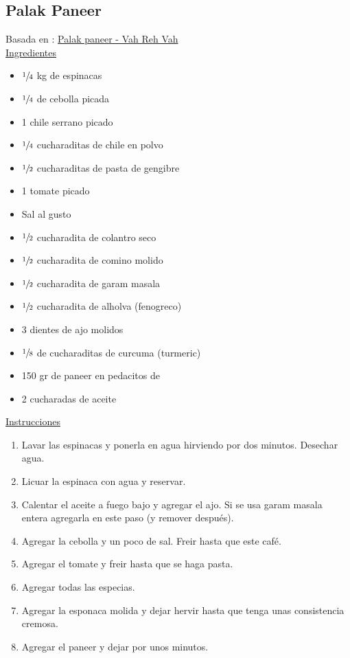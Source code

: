 \subsection{Palak Paneer}

Basada en : \href{https://www.vahrehvah.com/palak-paneer}{Palak paneer - Vah Reh Vah} \\

\underline{Ingredientes}
\begin{itemize}
\item $\sfrac{1}{4}$ kg de espinacas
\item $\sfrac{1}{4}$  de cebolla picada
\item 1 chile serrano picado
\item $\sfrac{1}{4}$ cucharaditas de chile en polvo
\item $\sfrac{1}{2}$ cucharaditas de pasta de gengibre
\item 1 tomate picado
\item Sal al gusto
\item $\sfrac{1}{2}$ cucharadita de colantro seco
\item $\sfrac{1}{2}$ cucharadita de comino molido
\item $\sfrac{1}{2}$ cucharadita de garam masala
\item $\sfrac{1}{2}$ cucharadita de alholva (fenogreco)
\item 3 dientes de ajo molidos
\item $\sfrac{1}{8}$ de cucharaditas de curcuma (turmeric)
\item 150 gr de paneer en pedacitos de \Sim 1cm
\item 2 cucharadas de aceite
\end{itemize}


\underline{Instrucciones}
\begin{enumerate}
\item Lavar las espinacas y ponerla en agua hirviendo por dos minutos. Desechar agua.
\item Licuar la espinaca con agua y reservar.
\item Calentar el aceite a fuego bajo y agregar el ajo. Si se usa garam masala entera agregarla en este paso (y remover después).
\item Agregar la cebolla y un poco de sal. Freir hasta que este café.
\item Agregar el tomate y freir hasta que se haga pasta.
\item Agregar todas las especias.
\item Agregar la esponaca molida y dejar hervir hasta que tenga unas consistencia cremosa.
\item Agregar el paneer y dejar por unos minutos.
\end{enumerate}

